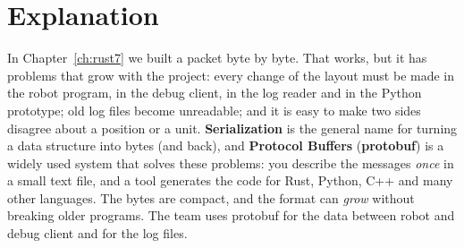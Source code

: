 \label{ch:rust8}

\section*{Explanation}
In Chapter~\ref{ch:rust7} we built a packet byte by byte. That works, but it has problems that grow with the project: every change of the layout must be made in the robot program, in the debug client, in the log reader and in the Python prototype; old log files become unreadable; and it is easy to make two sides disagree about a position or a unit. \textbf{Serialization} is the general name for turning a data structure into bytes (and back), and \textbf{Protocol Buffers} (\textbf{protobuf}) is a widely used system that solves these problems: you describe the messages \emph{once} in a small text file, and a tool generates the code for Rust, Python, C++ and many other languages. The bytes are compact, and the format can \emph{grow} without breaking older programs. The team uses protobuf for the data between robot and debug client and for the log files.

\begin{center}
\end{center}

